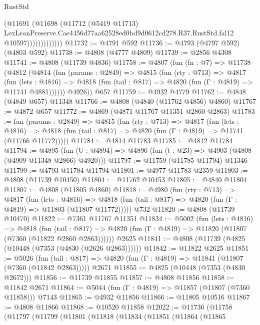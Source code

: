 \begin{lexlean}{RustStd}
\begin{coremodule}
                        (@11691
                          (@11698
                            (@11712
                              (@5419 @11713)
                              LexLeanPreserve.Cae4456d77aa62528ed0bd9d0612cd278.R37.RustStd.fal12
                              @10597)))))))))))))
@11732 := @4791 @592
@11736 := @4793 (@4797 @592) (@4803 @592)
@11738 := @4808 (@4777 @4809)
@11739 := @2856 @4308
@11741 := @4808 (@11739 @4836)
@11758 := @4807
    (fun (fn : @7) =>
    @11738
      (@4812
        (@4814
          (fun (params : @2849) =>
          @4815
            (fun (rty : @713) =>
            @4817
              (fun (lets : @4816) =>
              @4818 (fun (tail : @817) => @4820 (fun (Γ : @4819) => @11741 @4881))))))
        @4926))
    @657
@11759 := @4932 @4779
@11762 := @4848 (@4849 @657) @11348
@11766 := @4808 (@4840 (@11762 @4856) @4860)
@11767 := @4872 @657
@11772 := @4869 (@4871 @11767 @11351 @2860 @2863)
@11783 := fun (params : @2849) =>
  @4815
    (fun (rty : @713) =>
    @4817
      (fun (lets : @4816) =>
      @4818 (fun (tail : @817) => @4820 (fun (Γ : @4819) => @11741 (@11766 @11772)))))
@11784 := @4814 @11783
@11785 := @4812 @11784
@11794 := @4895
    (fun (U : @4894) => @4896 (fun (t : @23) => @4903 (@4808 (@4909 @11348 @2866) @4920)))
@11797 := @11759 (@11785 @11794) @11346
@11799 := @4793 @11784 @11794
@11801 := @4977 @11783 @2359
@11803 := @4808 (@11739 @10450)
@11804 := @11762 @10453
@11805 := @4840 @11804
@11807 := @4808 (@11805 @4860)
@11818 := @4980
    (fun (rty : @713) =>
    @4817
      (fun (lets : @4816) =>
      @4818 (fun (tail : @817) => @4820 (fun (Γ : @4819) => @11803 (@11807 @11772)))))
    @732
@11820 := @4808 (@11739 @10470)
@11822 := @7361 @11767 @11351
@11834 := @5002
    (fun (lets : @4816) =>
    @4818
      (fun (tail : @817) =>
      @4820 (fun (Γ : @4819) => @11820 (@11807 (@7360 (@11822 @2860 @2863))))))
    @2625
@11841 := @4808 (@11739 (@4825 (@10448 (@7353 (@4830 (@2626 @2863))))))
@11842 := @11822 @2625
@11851 := @5026
    (fun (tail : @817) => @4820 (fun (Γ : @4819) => @11841 (@11807 (@7360 (@11842 @2863)))))
    @2671
@11855 := @4825 (@10448 (@7353 (@4830 @2672)))
@11856 := @11739 @11855
@11857 := @4808 @11856
@11858 := @11842 @2671
@11864 := @5044 (fun (Γ : @4819) => @11857 (@11807 (@7360 @11858))) @7143
@11865 := @4932 @11856
@11866 := @11805 @10516
@11867 := @4808 @11866
@11868 := @10520 @11858
@12022 := @11736
    (@11758
      (@11797
        (@11799
          (@11801
            (@11818
              (@11834
                (@11851
                  (@11864
                    (@11865

\end{coremodule}
\end{lexlean}

